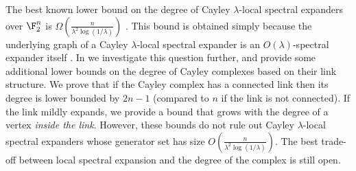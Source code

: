 \begin{remark}
The best known lower bound on the degree of Cayley $\lambda$-local spectral expanders over \(\F_2^n\) is $\Omega \left (\frac{n}{\lambda^2 \log (1/\lambda)} \right)$ \cite{alon1992simple}. This bound is obtained simply because the underlying graph of a Cayley \(\lambda\)-local spectral expander is an \(O(\lambda)\)-spectral expander itself \cite{oppenheim2018local}. In  we investigate this question further, and provide some additional lower bounds on the degree of Cayley complexes based on their link structure. We prove that if the Cayley complex has a connected link then its degree is lower bounded by \(2n-1\) (compared to \(n\) if the link is not connected). If the link mildly expands, we provide a bound that grows with the degree of a vertex \emph{inside the link}. However, these bounds do not rule out Cayley \(\lambda\)-local spectral expanders whose generator set has size $O \left (\frac{n}{\lambda^2 \log (1/\lambda)} \right)$. The best trade-off between local spectral expansion and the degree of the complex is still open.
\end{remark}

